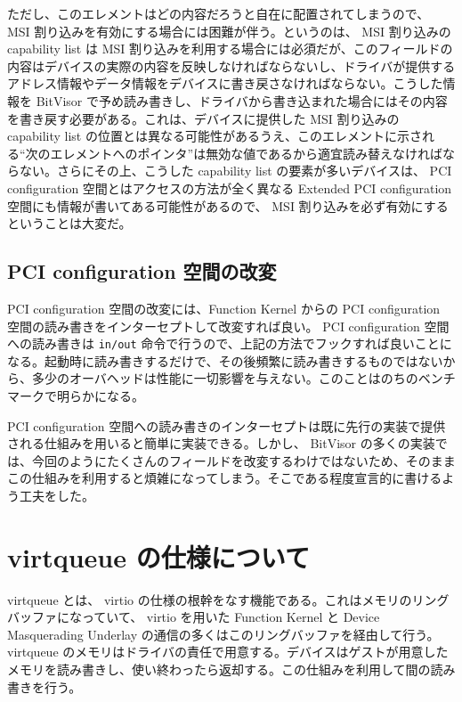 \documentclass[a4paper,11pt,report]{ltjsbook}
\begin{document}
ただし、このエレメントはどの内容だろうと自在に配置されてしまうので、 MSI 割り込みを有効にする場合には困難が伴う。というのは、 MSI 割り込みの capability list は MSI 割り込みを利用する場合には必須だが、このフィールドの内容はデバイスの実際の内容を反映しなければならないし、ドライバが提供するアドレス情報やデータ情報をデバイスに書き戻さなければならない。こうした情報を BitVisor で予め読み書きし、ドライバから書き込まれた場合にはその内容を書き戻す必要がある。これは、デバイスに提供した MSI 割り込みの capability list の位置とは異なる可能性があるうえ、このエレメントに示される``次のエレメントへのポインタ''は無効な値であるから適宜読み替えなければならない。さらにその上、こうした capability list の要素が多いデバイスは、 PCI configuration 空間とはアクセスの方法が全く異なる Extended PCI configuration 空間にも情報が書いてある可能性があるので、 MSI 割り込みを必ず有効にするということは大変だ。

\subsection{PCI configuration 空間の改変}

PCI configuration 空間の改変には、Function Kernel からの PCI configuration 空間の読み書きをインターセプトして改変すれば良い。 PCI configuration 空間への読み書きは \texttt{in/out} 命令で行うので、上記の方法でフックすれば良いことになる。起動時に読み書きするだけで、その後頻繁に読み書きするものではないから、多少のオーバヘッドは性能に一切影響を与えない。このことはのちのベンチマークで明らかになる。

PCI configuration 空間への読み書きのインターセプトは既に先行の実装\cite{bitvisor}で提供される仕組みを用いると簡単に実装できる。しかし、 BitVisor の多くの実装では、今回のようにたくさんのフィールドを改変するわけではないため、そのままこの仕組みを利用すると煩雑になってしまう。そこである程度宣言的に書けるよう工夫をした。

\section{virtqueue の仕様について}

virtqueue とは、 virtio の仕様の根幹をなす機能である。これはメモリのリングバッファになっていて、 virtio を用いた Function Kernel と Device Masquerading Underlay の通信の多くはこのリングバッファを経由して行う。 virtqueue のメモリはドライバの責任で用意する。デバイスはゲストが用意したメモリを読み書きし、使い終わったら返却する。この仕組みを利用して間の読み書きを行う。
\end{document}
